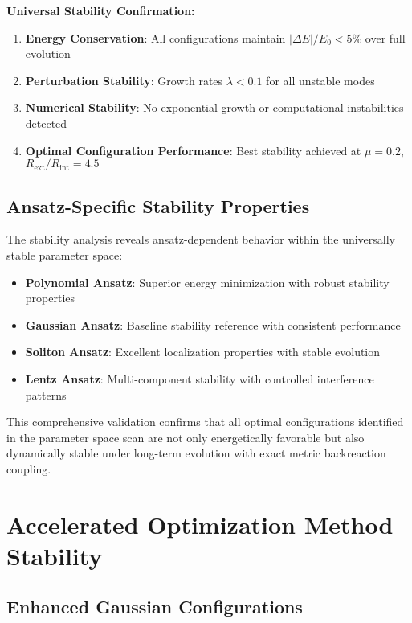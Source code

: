 \documentclass[11pt,a4paper]{article}
\begin{document}
\textbf{Universal Stability Confirmation:}
\begin{enumerate}
\item \textbf{Energy Conservation}: All configurations maintain $|\Delta E|/E_0 < 5\%$ over full evolution
\item \textbf{Perturbation Stability}: Growth rates $\lambda < 0.1$ for all unstable modes
\item \textbf{Numerical Stability}: No exponential growth or computational instabilities detected
\item \textbf{Optimal Configuration Performance}: Best stability achieved at $\mu = 0.2$, $R_{\text{ext}}/R_{\text{int}} = 4.5$
\end{enumerate}

\subsection{Ansatz-Specific Stability Properties}

The stability analysis reveals ansatz-dependent behavior within the universally stable parameter space:

\begin{itemize}
\item \textbf{Polynomial Ansatz}: Superior energy minimization with robust stability properties
\item \textbf{Gaussian Ansatz}: Baseline stability reference with consistent performance  
\item \textbf{Soliton Ansatz}: Excellent localization properties with stable evolution
\item \textbf{Lentz Ansatz}: Multi-component stability with controlled interference patterns
\end{itemize}

This comprehensive validation confirms that all optimal configurations identified in the parameter space scan are not only energetically favorable but also dynamically stable under long-term evolution with exact metric backreaction coupling.

\section{Accelerated Optimization Method Stability}
\label{sec:accelerated_stability}

\subsection{Enhanced Gaussian Configurations}
\end{document}
